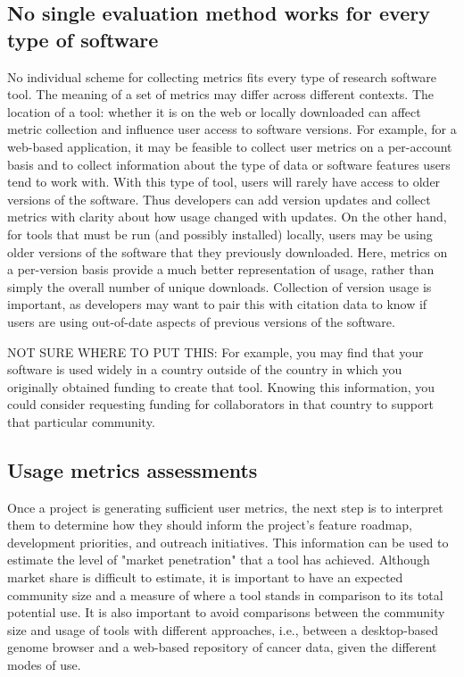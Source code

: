 \documentclass{article}
\begin{document}
\subsection{No single evaluation method works for every type of software}
\label{sec:no_one_way}
No individual scheme for collecting metrics fits every type of research software tool.  The meaning of a set of metrics may differ across different contexts. The location of a tool: whether it is on the web or locally downloaded can affect metric collection and influence user access to software versions. For example, for a web-based application, it may be feasible to collect user metrics on a per-account basis and to collect information about the type of data or software features users tend to work with. With this type of tool, users will rarely have access to older versions of the software. Thus developers can add version updates and collect metrics with clarity about how usage changed with updates. On the other hand, for tools that must be run (and possibly installed)  locally, users may be using older versions of the software that they previously downloaded.  Here, metrics on a per-version basis provide a much better representation of usage, rather than simply the overall number of unique downloads. Collection of version usage is important, as developers may want to pair this with citation data to know if users are using out-of-date aspects of previous versions of the software.


NOT SURE WHERE TO PUT THIS:
For example, you may find that your software is used widely in a country outside of the country in which you originally obtained funding to create that tool. Knowing this information, you could consider requesting funding for collaborators in that country to support that particular community.

 \subsection{Usage metrics assessments}
Once a project is generating sufficient user metrics, the next step is to interpret them to determine how they should inform the project's feature roadmap, development priorities, and outreach initiatives. This information can be used to estimate the level of "market penetration" that a tool has achieved. Although market share is difficult to estimate, it is important to have an expected community size and a measure of where a tool stands in comparison to its total potential use. It is also important to avoid comparisons between the community size and usage of tools with different approaches, i.e., between a desktop-based genome browser and a web-based repository of cancer data, given the different modes of use. 
\end{document}

